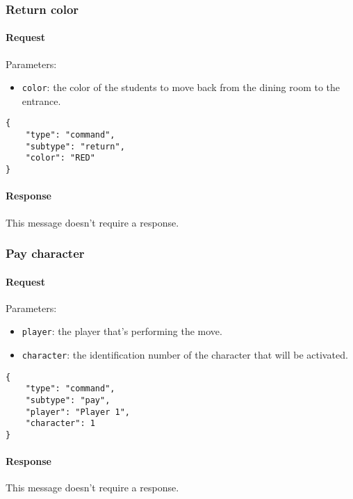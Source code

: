 \documentclass[a4paper]{article}
\begin{document}
	\subsubsection{Return color}

	\paragraph{Request} Parameters:

	\begin{itemize}
		\item \verb|color|: the color of the students to move back from the dining room to the entrance.
	\end{itemize}

	\begin{verbatim}
{
	"type": "command",
	"subtype": "return",
	"color": "RED"
}
	\end{verbatim}

	\paragraph{Response} This message doesn't require a response.

	\subsubsection{Pay character}

	\paragraph{Request} Parameters:

	\begin{itemize}
		\item \verb|player|: the player that's performing the move.
		\item \verb|character|: the identification number of the character that will be activated.
	\end{itemize}

	\begin{verbatim}
{
	"type": "command",
	"subtype": "pay",
	"player": "Player 1",
	"character": 1
}
	\end{verbatim}

	\paragraph{Response} This message doesn't require a response.
\end{document}
